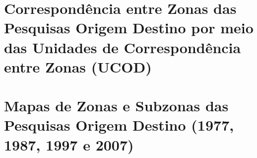 %
%
%
%
%
%
%
%
%
%
%
%
%
\chapter{Correspondência entre Zonas das Pesquisas Origem Destino por meio das Unidades de Correspondência entre Zonas (UCOD)}\label{chap:anexo_ucod}



\chapter{Mapas de Zonas e Subzonas das Pesquisas Origem Destino (1977, 1987, 1997 e 2007)}\label{chap:anexo_mapas_zonas}
%
%
%
%
